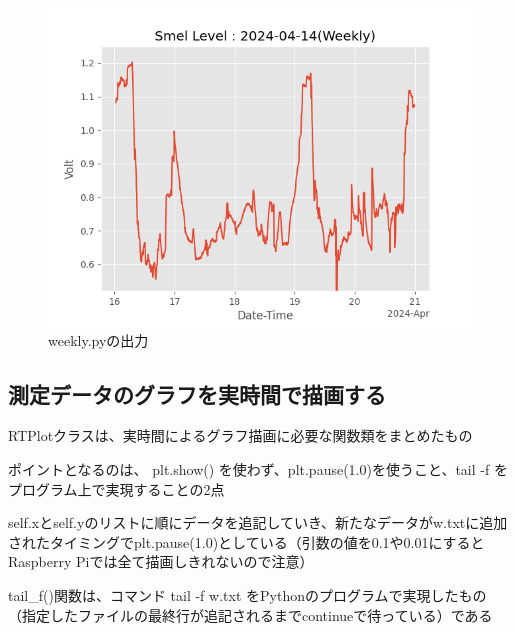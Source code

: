 \documentclass[12pt,a4paper,uplatex]{jsbook}
\begin{document}
\begin{figure}[htbp]
	\begin{minipage}[b]{1.0\linewidth}
		\centering
		\includegraphics[keepaspectratio, scale=0.8]{figs/png/Weekly_2024-04-14.png}
		\caption{weekly.pyの出力}
	\end{minipage}
\end{figure}


\subsection{測定データのグラフを実時間で描画する}

	RTPlotクラスは、実時間によるグラフ描画に必要な関数類をまとめたもの
	
	ポイントとなるのは、 plt.show() を使わず、plt.pause(1.0)を使うこと、tail -f をプログラム上で実現することの2点
	
	self.xとself.yのリストに順にデータを追記していき、新たなデータがw.txtに追加されたタイミングでplt.pause(1.0)としている（引数の値を0.1や0.01にするとRaspberry Piでは全て描画しきれないので注意）
	
	tail\_f()関数は、コマンド tail -f w.txt をPythonのプログラムで実現したもの（指定したファイルの最終行が追記されるまでcontinueで待っている）である
\end{document}
